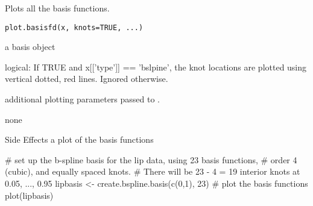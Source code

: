\documentclass{article}
\begin{document}
\begin{Description}\relax
Plots all the basis functions.
\end{Description}
\begin{Usage}
\begin{verbatim}
plot.basisfd(x, knots=TRUE, ...)
\end{verbatim}
\end{Usage}
\begin{Arguments}
\begin{ldescription}
\item[\code{x}] a basis object

\item[\code{knots}] logical:  If TRUE and x[['type']] == 'bslpine', the knot locations
are plotted using vertical dotted, red lines.  Ignored otherwise.  

\item[\code{... }] additional plotting parameters passed to .  

\end{ldescription}
\end{Arguments}
\begin{Value}
none
\end{Value}
\begin{Section}{Side Effects}
a plot of the basis functions
\end{Section}
\begin{SeeAlso}\relax
{}
\end{SeeAlso}
\begin{Examples}
\begin{ExampleCode}

# set up the b-spline basis for the lip data, using 23 basis functions,
#   order 4 (cubic), and equally spaced knots.
#  There will be 23 - 4 = 19 interior knots at 0.05, ..., 0.95
lipbasis <- create.bspline.basis(c(0,1), 23)
# plot the basis functions
plot(lipbasis)

\end{ExampleCode}
\end{Examples}
\end{document}
